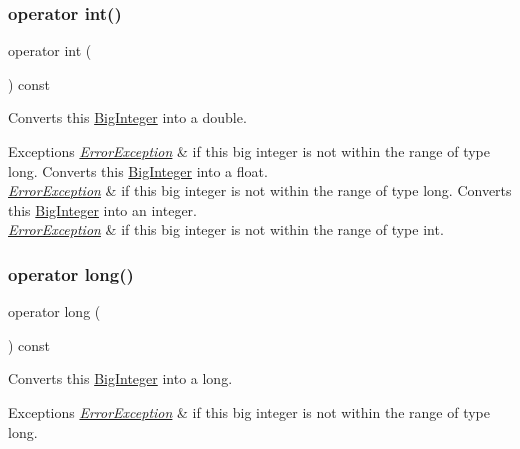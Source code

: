 \subsubsection{\texorpdfstring{operator int()}{operator int()}}
{\footnotesize\ttfamily operator int (\begin{DoxyParamCaption}{ }\end{DoxyParamCaption}) const\hspace{0.3cm}{\ttfamily [explicit]}}



Converts this \mbox{\hyperlink{classBigInteger}{Big\+Integer}} into a double. 


\begin{DoxyExceptions}{Exceptions}
{\em \mbox{\hyperlink{classErrorException}{Error\+Exception}}} & if this big integer is not within the range of type long. Converts this \mbox{\hyperlink{classBigInteger}{Big\+Integer}} into a float. \\
\hline
{\em \mbox{\hyperlink{classErrorException}{Error\+Exception}}} & if this big integer is not within the range of type long. Converts this \mbox{\hyperlink{classBigInteger}{Big\+Integer}} into an integer. \\
\hline
{\em \mbox{\hyperlink{classErrorException}{Error\+Exception}}} & if this big integer is not within the range of type int. \\
\hline
\end{DoxyExceptions}
\mbox{\label{classBigInteger_ad7ce59321a0dd63e7f1fab6dceabe53b}} 
\subsubsection{\texorpdfstring{operator long()}{operator long()}}
{\footnotesize\ttfamily operator long (\begin{DoxyParamCaption}{ }\end{DoxyParamCaption}) const\hspace{0.3cm}{\ttfamily [explicit]}}



Converts this \mbox{\hyperlink{classBigInteger}{Big\+Integer}} into a long. 


\begin{DoxyExceptions}{Exceptions}
{\em \mbox{\hyperlink{classErrorException}{Error\+Exception}}} & if this big integer is not within the range of type long. \\
\hline
\end{DoxyExceptions}
\mbox{\label{classBigInteger_a3888dcd59dd5acd1ca5b9bee4c2e252a}} 
